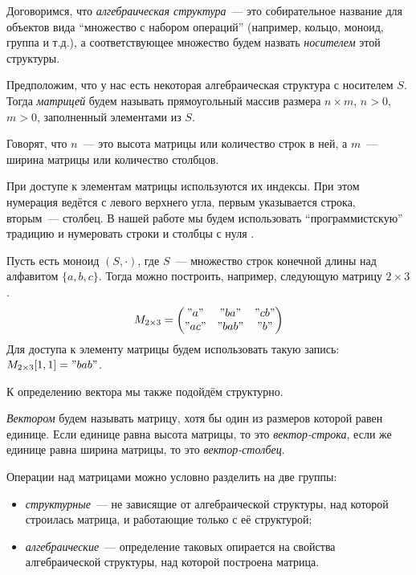 Договоримся, что \emph{алгебраическая структура}~--- это собирательное название для объектов вида \enquote{множество с набором операций} (например, кольцо, моноид, группа и т.д.), а соответствующее множество будем назвать \emph{носителем} этой структуры.

\begin{definition}[Матрица]
    Предположим, что у нас есть некоторая алгебраическая структура с носителем $S$. Тогда \emph{матрицей} будем называть прямоугольный массив размера $n \times m$, $n > 0$, $m > 0$, заполненный элементами из $S$.

    Говорят, что $n$~--- это высота матрицы или количество строк в ней, а $m$~--- ширина матрицы или количество столбцов.
\end{definition}

При доступе к элементам матрицы используются их индексы.
При этом нумерация ведётся с левого верхнего угла, первым указывается строка, вторым~--- столбец.
В нашей работе мы будем использовать \enquote{программистскую} традицию и нумеровать строки и столбцы с нуля%
%
.

\begin{example}
    Пусть есть моноид $(S, \cdot)$, где $S$~--- множество строк конечной длины над алфавитом $\{a, b, c\}$.
    Тогда можно построить, например, следующую матрицу $2 \times 3$.
    \[
        M_{2 \times 3} =
        \begin{pmatrix}
            "a"  & "ba"  & "cb" \\
            "ac" & "bab" & "b"
        \end{pmatrix}
    \]
    Для доступа к элементу матрицы будем использовать такую запись: $M_{2 \times 3}[1, 1] = "bab"$.
\end{example}

К определению вектора мы также подойдём структурно.
\begin{definition}[Вектор]
    \emph{Вектором} будем называть матрицу, хотя бы один из размеров которой равен единице.
    Если единице равна высота матрицы, то это \emph{вектор-строка}, если же единице равна ширина матрицы, то это \emph{вектор-столбец}.
\end{definition}

Операции над матрицами можно условно разделить на две группы:
\begin{itemize}
    \item \emph{структурные}~--- не зависящие от алгебраической структуры, над которой строилась матрица, и работающие только с её структурой;
    \item \emph{алгебраические}~--- определение таковых опирается на свойства алгебраической структуры, над которой построена матрица.
\end{itemize}

